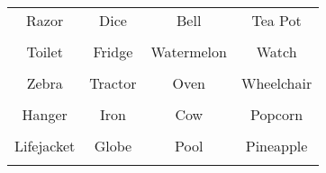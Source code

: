 \documentclass[12pt,a4paper]{article}
\begin{document}
\thispagestyle{empty}
\begin{table}[]
\centering
\Huge
\begin{tabular}{cccc}
 Razor& Dice& Bell& Tea Pot\\  & & & \\
 Toilet& Fridge& Watermelon& Watch\\  & & & \\
 Zebra& Tractor& Oven& Wheelchair\\  & & & \\
 Hanger& Iron& Cow& Popcorn\\  & & & \\
 Lifejacket& Globe& Pool& Pineapple\\  & & & \\
\end{tabular}
\end{table}
\end{document}
